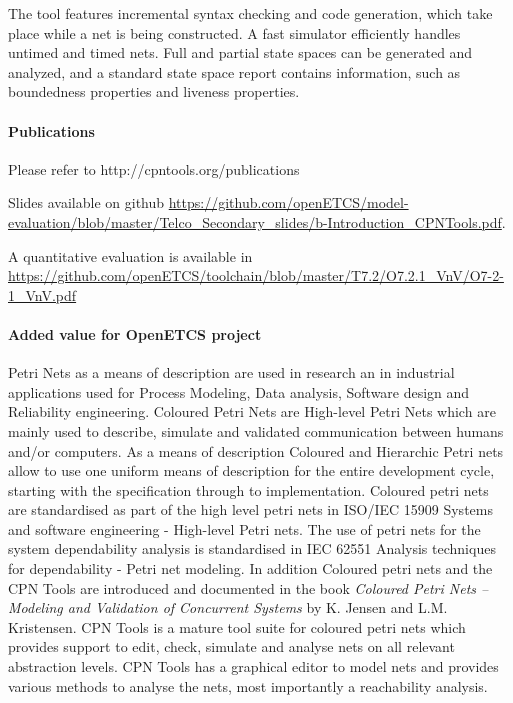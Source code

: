  The tool features incremental syntax checking and code generation, which take place while a net is being constructed. A fast simulator efficiently handles untimed and timed nets. Full and partial state spaces can be generated and analyzed, and a standard state space report contains information, such as boundedness properties and liveness properties.
 
 \paragraph{Publications} Please refer to http://cpntools.org/publications
 
 Slides available on github \url{https://github.com/openETCS/model-evaluation/blob/master/Telco_Secondary_slides/b-Introduction_CPNTools.pdf}.
 
 A quantitative evaluation is available in \url{https://github.com/openETCS/toolchain/blob/master/T7.2/O7.2.1_VnV/O7-2-1_VnV.pdf}
 
 \paragraph{Added value for OpenETCS project}
 
 Petri Nets as a means of description are used in research an in industrial applications used for Process Modeling, Data analysis, Software design and Reliability engineering. Coloured Petri Nets are  High-level Petri Nets which are mainly used to describe, simulate and validated communication between humans and/or computers. As a means of description Coloured and  Hierarchic Petri nets allow to use one uniform means of description for the entire development cycle, starting with  the specification through to  implementation. 
 Coloured petri nets are standardised as part of the high level petri nets in ISO/IEC 15909 Systems and software engineering - High-level Petri nets. The use of petri nets for the system dependability analysis is standardised in IEC 62551 Analysis techniques for dependability - Petri net modeling. In addition Coloured petri nets and the CPN Tools are introduced and documented in the book \textit{Coloured Petri Nets -- Modeling and Validation of Concurrent Systems} by K. Jensen and L.M. Kristensen. CPN Tools is a mature tool suite for coloured petri nets which provides support to edit, check, simulate and analyse nets on all relevant abstraction levels. CPN Tools has a graphical editor to model nets and provides various methods to analyse the nets, most importantly a reachability analysis. 
 
